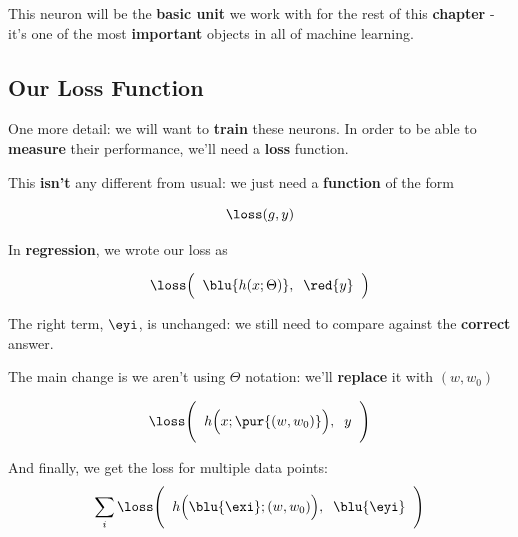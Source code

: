         This neuron will be the \textbf{basic unit} we work with for the rest of this \textbf{chapter} - it's one of the most \textbf{important} objects in all of machine learning.
        
    \subsection{Our Loss Function}
    
        One more detail: we will want to \textbf{train} these neurons. In order to be able to \textbf{measure} their performance, we'll need a \textbf{loss} function.
        
        This \textbf{isn't} any different from usual: we just need a \textbf{function} of the form
        
        \begin{equation}
            \loss(g,y)
        \end{equation}
        
        In \textbf{regression}, we wrote our loss as
        
        \begin{equation*}
            \loss 
            \Big( \;\;
                \blu{h(x; \Theta)}, \;\;
                \red{y} 
            \;\;\Big) 
        \end{equation*}
        
        The right term, $\eyi$, is unchanged: we still need to compare against the \textbf{correct} answer.
        
        The main change is we aren't using $\Theta$ notation: we'll \textbf{replace} it with $(w,w_0)$
        
        \begin{equation*}
            \loss 
            \Bigg( \;\;
                h
                \Big(
                    x; \pur{(w, w_0)}
                \Big), \;\;
                y 
            \;\;\Bigg) 
        \end{equation*}
        
        And finally, we get the loss for multiple data points: 
        \begin{equation*}
            \sum_i
            \loss 
            \Bigg( \;\;
                h
                \Big(
                    \blu{\exi}; (w, w_0)
                \Big), \;\;
                \blu{\eyi} 
            \;\;\Bigg) 
        \end{equation*}
        
